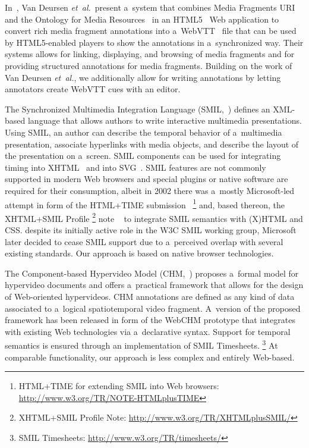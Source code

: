 \documentclass[runningheads,a4paper]{llncs}
\newcommand{\inlinelistingsize}{\fontsize{8pt}{11pt}}
\let\oldurl\url
\renewcommand{\url}[1]{\inlinelistingsize\oldurl{#1}}
\begin{document}
In~\cite{vandeursen2012mediafragmentannotations},
Van Deursen \emph{et~al.}\ present a~system
that combines Media Fragments URI~\cite{troncy2012mediafragments}
and the Ontology for Media Resources~\cite{lee2012mediaontology}
in an HTML5~\cite{berjon2013html5}
Web application to convert rich media fragment annotations
into a~WebVTT~\cite{pfeiffer2013webvtt} file
that can be used by HTML5-enabled players
to show the annotations in a~synchronized way.
Their systems allows for linking, displaying, and
browsing of media fragments and
for providing structured annotations for media fragments.
Building on the work of Van Deursen \emph{et~al.},
we additionally allow for writing annotations by
letting annotators create WebVTT cues with an editor.

The Synchronized Multimedia Integration Language
(SMIL,~\cite{bulterman2006smil})
defines an XML-based language that allows authors
to write interactive multimedia presentations.
Using SMIL, an author can describe the temporal behavior
of a~multimedia presentation, associate hyperlinks
with media objects, and describe the layout
of the presentation on a~screen.
SMIL components can be used for integrating timing
into XHTML~\cite{pemberton2002xhtml}
and into SVG~\cite{ferraiolo2003svg}.
SMIL features are not commonly supported
in modern Web browsers and special plugins or native software
are required for their consumption,
albeit in 2002 there was a~mostly Microsoft-led attempt
in form of the HTML+TIME submission~\cite{schmitz1998htmltime}
\footnote{HTML+TIME for extending SMIL into Web browsers: \url{http://www.w3.org/TR/NOTE-HTMLplusTIME}}
and, based thereon, the XHTML+SMIL Profile%
\footnote{XHTML+SMIL Profile Note:
\url{http://www.w3.org/TR/XHTMLplusSMIL/}} note
~\cite{newman2002xhtmlsmil}
to integrate SMIL semantics with (X)HTML and CSS.
despite its initially active role in the W3C SMIL working group,
Microsoft later decided to cease SMIL support
due to a~perceived overlap with several existing standards.
Our approach is based on native browser technologies.

The Component-based Hypervideo Model
(CHM,~\cite{sadallah2012hypervideo})
proposes a~formal model for hypervideo documents
and offers a~practical framework that allows for
the design of Web-oriented hypervideos.
CHM annotations are defined as any kind of data associated to
a~logical spatiotemporal video fragment.
A~version of the proposed framework
has been released in form of the WebCHM prototype
that integrates with existing Web technologies
via a~declarative syntax.
Support for temporal semantics is ensured through
an implementation of SMIL Timesheets.%
\footnote{SMIL Timesheets:
\url{http://www.w3.org/TR/timesheets/}}
At comparable functionality, our approach is less complex
and entirely Web-based.
\end{document}
